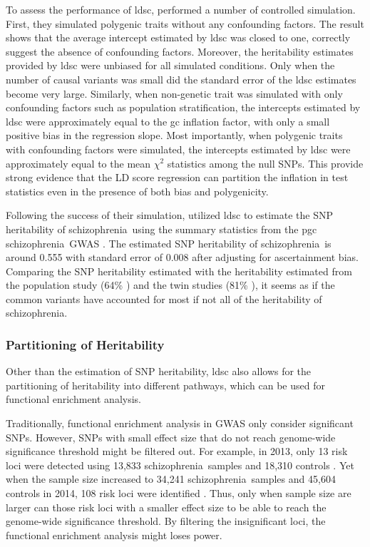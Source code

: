 \documentclass[12pt]{scrbook}
\newcommand*{\scz}{schizophrenia}
\begin{document}
To assess the performance of \gls{ldsc}, \citet{Bulik-Sullivan2015} performed a number of controlled simulation.
First, they simulated polygenic traits without any confounding factors. 
The result shows that the average intercept estimated by \gls{ldsc} was closed to one, correctly suggest the absence of confounding factors.
Moreover, the heritability estimates provided by \gls{ldsc} were unbiased for all simulated conditions. 
Only when the number of causal variants was small did the standard error of the \gls{ldsc} estimates become very large.
Similarly, when non-genetic trait was simulated with only confounding factors such as population stratification, the intercepts estimated by \gls{ldsc} were approximately equal to the \gls{gc} inflation factor, with only a small positive bias in the regression slope.
Most importantly, when polygenic traits with confounding factors were simulated, the intercepts estimated by \gls{ldsc} were approximately equal to the mean $\chi^2$ statistics among the null \glspl{SNP}.
This provide strong evidence that the \gls{LD} score regression can partition the inflation in test statistics even in the presence of both bias and polygenicity.

Following the success of their simulation, \citet{Bulik-Sullivan2015} utilized \gls{ldsc} to estimate the \gls{SNP} heritability of \scz\ using the summary statistics from the \gls{pgc} \scz\ \gls{GWAS} \citep{Ripke2014}.
The estimated \gls{SNP} heritability of \scz\ is around 0.555 with standard error of 0.008 after adjusting for ascertainment bias. 
Comparing the \gls{SNP} heritability estimated with the heritability estimated from the population study (64\% \citep{Lichtenstein2009}) and the twin studies (81\% \citep{Sullivan2003}), it seems as if the common variants have accounted for most if not all of the heritability of \scz.

\subsubsection{Partitioning of Heritability}
Other than the estimation of \gls{SNP} heritability, \gls{ldsc} also allows for the partitioning of heritability into different pathways, which can be used for functional enrichment analysis. 

Traditionally, functional enrichment analysis in \gls{GWAS} only consider significant \glspl{SNP}. 
However, \glspl{SNP} with small effect size that do not reach genome-wide significance threshold might be filtered out.
For example, in 2013, only 13 risk loci were detected using 13,833 \scz\ samples and 18,310 controls \citep{Ripke2013}. 
Yet when the sample size increased to 34,241 \scz\ samples and 45,604 controls in 2014, 108 risk loci were identified \citep{Ripke2014}.
Thus, only when sample size are larger can those risk loci with a smaller effect size to be able to reach the genome-wide significance threshold.
By filtering the insignificant loci, the functional enrichment analysis might loses power. 
\end{document}
